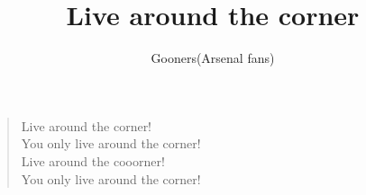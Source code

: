 \documentclass[a4paper,12pt]{article}
\title{Live around the corner}
\author{Gooners(Arsenal fans)}
\date{}
\begin{document}
	
	\maketitle
	
	\begin{verse}
		
		Live around the corner! \\
		You only live around the corner! \\
		Live around the cooorner! \\
		You only live around the corner!
		
	\end{verse}
	
\end{document}
